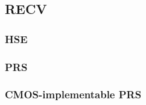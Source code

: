\documentclass{article}
\begin{document}
\subsection{RECV}

\subsubsection{HSE}

\subsubsection{PRS}

\subsubsection{CMOS-implementable PRS}

\end{document}
